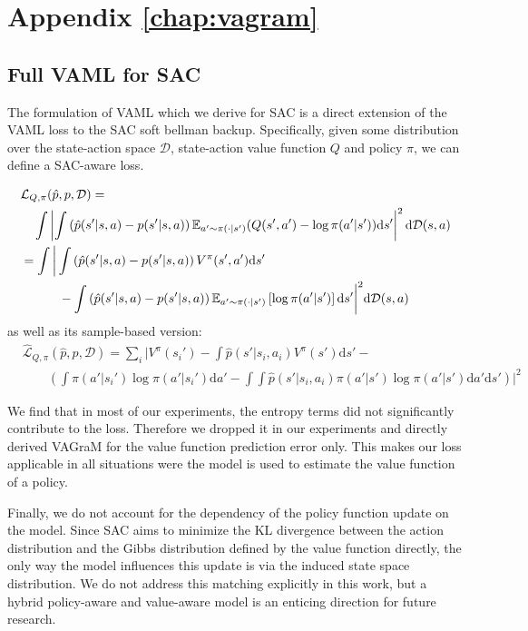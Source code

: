 \chapter{Appendix \autoref{chap:vagram}}

\section{Full VAML for SAC}
\label{app:vaml_sac}
The formulation of VAML which we derive for SAC is a direct extension of the VAML loss to the SAC soft bellman backup. Specifically, given some distribution over the state-action space $\mathcal{D}$, state-action value function $Q$ and policy $\pi$, we can define a SAC-aware loss.

\begin{align}
    &\mathcal{L}_{Q, \pi}(\hat{p}, p, \mathcal{D}) = \nonumber\\
    &\quad \int \left|\int \left(\hat{p}(s'|s,a) - p(s'|s,a)\right) \mathbb{E}_{a' \sim \pi(\cdot| s')}{\left(Q(s', a') - \log \pi(a'|s')\right)} \mathrm{d}s'\right|^2 \mathrm{d} \mathcal{D}(s,a)\\
    &= \int \bigg|\int \left(\hat{p}(s'|s,a) - p(s'|s,a)\right) V^\pi(s', a')\mathrm{d}s' \nonumber\\
    &\quad\quad\quad- \int \left(\hat{p}(s'|s,a) - p(s'|s,a)\right)\mathbb{E}_{a' \sim \pi(\cdot| s')}\left[\log \pi(a'|s')\right] \mathrm{d}s'\bigg|^2 \mathrm{d} \mathcal{D}(s,a)
\end{align}
as well as its sample-based version:
\begin{align}
    &\hat{\mathcal{L}}_{Q, \pi}(\hat{p}, p, \mathcal{D}) = \sum_{i} \bigg|V^\pi(s_i') -\int \hat{p}(s'|s_i, a_i) V^\pi(s') \mathrm{d}s' - \nonumber\\&\quad\quad\left(\int \pi(a'|s_i')\log\pi(a' | s_i') \mathrm{d}a'- \int \int \hat{p}(s'|s_i,a_i)\pi(a'|s')\log\pi(a' | s')\mathrm{d}a' \mathrm{d}s' \right)\bigg|^2\label{SACVAMLLoss}
\end{align}

We find that in most of our experiments, the entropy terms did not significantly contribute to the loss. 
Therefore we dropped it in our experiments and directly derived VAGraM for the value function prediction error only.
This makes our loss applicable in all situations were the model is used to estimate the value function of a policy.

Finally, we do not account for the dependency of the policy function update on the model.
Since SAC aims to minimize the KL divergence between the action distribution and the Gibbs distribution defined by the value function directly, the only way the model influences this update is via the induced state space distribution.
We do not address this matching explicitly in this work, but a hybrid policy-aware and value-aware model is an enticing direction for future research.

